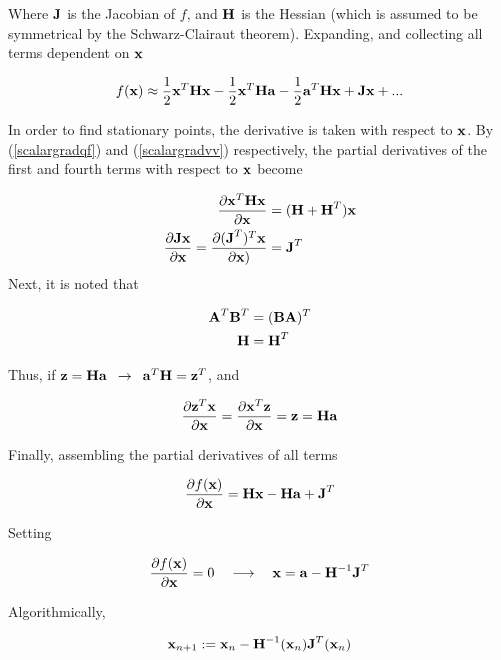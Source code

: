 \documentclass{article}
\newcommand{\vect}[1]{\textbf{\textrm{#1}}}
\newcommand{\pd}[2]{\frac{\partial {#1}}{\partial {#2}}}
\begin{document}
Where $\vect{J}$ is the Jacobian of $f$, and $\vect{H}$ is the Hessian (which is assumed to be symmetrical by the Schwarz-Clairaut theorem). 
Expanding, and collecting all terms dependent on $\vect{x}$

\begin{equation*}
	f(\vect{x}) \approx \frac{1}{2}\vect{x}^{T}\vect{Hx} - \frac{1}{2}\vect{x}^{T}\vect{Ha} -
						 \frac{1}{2}\vect{a}^{T}\vect{Hx} + \vect{Jx} + ...
\end{equation*}

In order to find stationary points, the derivative is taken with respect to $\vect{x}$. 
By (\ref{scalargradqf}) and (\ref{scalargradvv}) respectively, the partial derivatives of the first and fourth terms with respect to $\vect{x}$ become

\begin{align*}
	\pd{\vect{x}^{T}\vect{Hx}}{\vect{x}} & = (\vect{H} + \vect{H}^{T})\vect{x} \\
	\pd{\vect{Jx}}{\vect{x}} = \pd{(\vect{J}^{T})^{T}\vect{x}}{\vect{x})} & = \vect{J}^{T}
\end{align*}
Next, it is noted that

\begin{align*}
	\vect{A}^{T}\vect{B}^{T} & = (\vect{BA})^{T} \\
	\vect{H} & = \vect{H}^{T}
\end{align*}
	
Thus, if $\vect{z} = \vect{Ha} \enspace \rightarrow \enspace \vect{a}^{T}\vect{H} = \vect{z}^{T}$, and

\begin{equation*}
	\pd{\vect{z}^{T}\vect{x}}{\vect{x}} = \pd{\vect{x}^{T}\vect{z}}{\vect{x}} = 
	\vect{z} = \vect{Ha}
\end{equation*}

Finally, assembling the partial derivatives of all terms

\begin{equation}
	\pd{f(\vect{x})}{\vect{x}} = \vect{Hx} - \vect{Ha} + \vect{J}^{T}
\end{equation}

Setting

\begin{equation*}
	\pd{f(\vect{x})}{\vect{x}} = 0 \quad \longrightarrow \quad 
	\vect{x} = \vect{a} - \vect{H}^{-1}\vect{J}^{T}
\end{equation*}

Algorithmically,

\begin{equation}
	\vect{x}_{n+1} := \vect{x}_n - \vect{H}^{-1}(\vect{x}_n)\vect{J}^{T}(\vect{x}_n) \label{updaterule2}
\end{equation}
\end{document}
